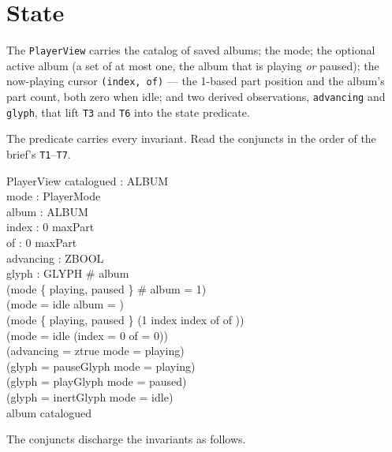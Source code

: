 \documentclass[a4paper,10pt,fleqn]{article}
\begin{document}
\section{State}
\label{sec:state}

The \texttt{PlayerView} carries the catalog of saved albums; the mode; the
optional active album (a set of at most one, the album that is playing
\emph{or} paused); the now-playing cursor \texttt{(index, of)} --- the 1-based
part position and the album's part count, both zero when idle; and two derived
observations, \texttt{advancing} and \texttt{glyph}, that lift \texttt{T3} and
\texttt{T6} into the state predicate.

The predicate carries every invariant. Read the conjuncts in the order of the
brief's \texttt{T1}--\texttt{T7}.

\begin{schema}{PlayerView}
  catalogued : \power ALBUM \\
  mode : PlayerMode \\
  album : \power ALBUM \\
  index : 0 \upto maxPart \\
  of : 0 \upto maxPart \\
  advancing : ZBOOL \\
  glyph : GLYPH
  \where
  \# album  \\
  (mode \in \{ playing, paused \} \iff \# album = 1) \\
  (mode = idle \iff album = \emptyset) \\
  (mode \in \{ playing, paused \} \implies (1 \leq index \land index \leq of \land of )) \\
  (mode = idle \implies (index = 0 \land of = 0)) \\
  (advancing = ztrue \iff mode = playing) \\
  (glyph = pauseGlyph \iff mode = playing) \\
  (glyph = playGlyph \iff mode = paused) \\
  (glyph = inertGlyph \iff mode = idle) \\
  album \subseteq catalogued
\end{schema}

The conjuncts discharge the invariants as follows.
\end{document}
